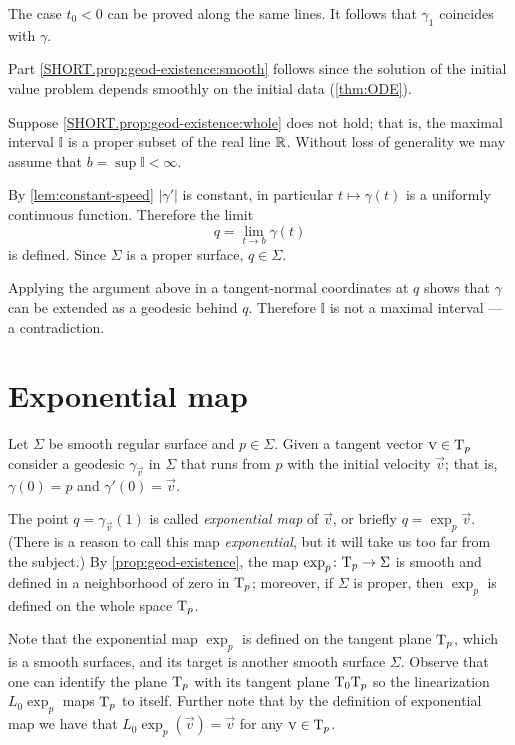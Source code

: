 The case $t_0<0$ can be proved along the same lines.
It follows that $\gamma_1$ coincides with $\gamma$.

Part \ref{SHORT.prop:geod-existence:smooth} follows since the solution of the initial value problem depends smoothly on the initial data (\ref{thm:ODE}).

Suppose \ref{SHORT.prop:geod-existence:whole} does not hold;
that is, the maximal interval $\mathbb{I}$ is a proper subset of the real line $\mathbb{R}$.
Without loss of generality we may assume that $b=\sup\mathbb{I}<\infty$.

By \ref{lem:constant-speed} $|\gamma'|$ is constant, in particular $t\mapsto \gamma(t)$ is a uniformly continuous function.
Therefore  the limit 
\[q=\lim_{t\to b}\gamma(t)\] 
is defined.
Since $\Sigma$ is a proper surface, $q\in \Sigma$. 

Applying the argument above in a tangent-normal coordinates at $q$ shows that $\gamma$ can be extended as a geodesic behind $q$.
Therefore $\mathbb{I}$ is not a maximal interval --- a contradiction.
\qeds




\section{Exponential map}\label{sec:exp}

Let $\Sigma$ be smooth regular surface and $p\in \Sigma$.
Given a tangent vector ${\textsc v}\in \mathrm{T}_p$ consider a geodesic $\gamma_{\vec v}$ in $\Sigma$ that runs from $p$ with the initial velocity ${\vec v}$;  
that is, $\gamma(0)=p$ and $\gamma'(0)={\vec v}$.

The point $q=\gamma_{\vec v}(1)$ is called \emph{exponential map} of ${\vec v}$, or briefly $q=\exp_p{\vec v}$.
(There is a reason to call this map \emph{exponential}, but it will take us too far from the subject.)
By \ref{prop:geod-existence}, the map $\exp_p\colon\mathrm{T}_p\to \Sigma$ is smooth and defined in a neighborhood of zero in $\mathrm{T}_p$;
moreover, if $\Sigma$ is proper, then $\exp_p$ is defined on the whole space $\mathrm{T}_p$.

Note that the exponential map $\exp_p$ 
is defined on the tangent plane $\mathrm{T}_p$, which is a smooth surfaces,
and its target is another smooth surface $\Sigma$.
Observe that one can identify the plane $\mathrm{T}_p$
with its tangent plane $\mathrm{T}_0\mathrm{T}_p$ so the linearization $L_0\exp_p$ maps $\mathrm{T}_p$ to itself.
Further note that by the definition of exponential map we have that $L_0\exp_p(\vec v)=
\vec v$ for any $\textsc v\in \mathrm{T}_p$.

